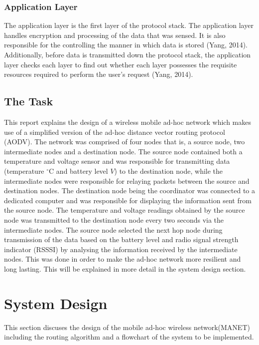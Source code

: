 \documentclass[a4paper]{article}
\begin{document}
\subsubsection*{Application Layer} 
The application layer is the first layer of the protocol stack. The application layer handles encryption and processing of the data that was sensed. It is also responsible for the controlling the manner in which data is stored (Yang, 2014). Additionally, before data is transmitted down the protocol stack, the application layer checks each layer to find out whether each layer possesses the requisite resources required to perform the user's request (Yang, 2014). 

\subsection{The Task}
This report explains the design of a wireless mobile ad-hoc network which makes use of a simplified version of the ad-hoc distance vector routing protocol (AODV). The network was comprised of four nodes that is, a source node, two intermediate nodes and a destination node. The source node contained both a temperature and voltage sensor and was responsible for transmitting data (temperature $^\circ$C and battery level $V$) to the destination node, while the intermediate nodes were responsible for relaying packets between the source and destination nodes. The destination node being the coordinator was connected to a dedicated computer and was responsible for displaying the information sent from the source node. The temperature and voltage readings obtained by the source node was transmitted to the destination node every two seconds via the intermediate nodes. The source node selected the next hop node during transmission of the data based on the battery level and radio signal strength indicator (RSSSI) by analysing the information received by the intermediate nodes. This was done in order to make the ad-hoc network more resilient and long lasting. This will be explained in more detail in the system design section.
\newpage

\section{System Design}

This section discuses the design of the mobile ad-hoc wireless network(MANET) including the routing algorithm and a flowchart of the system to be implemented. 
\end{document}
